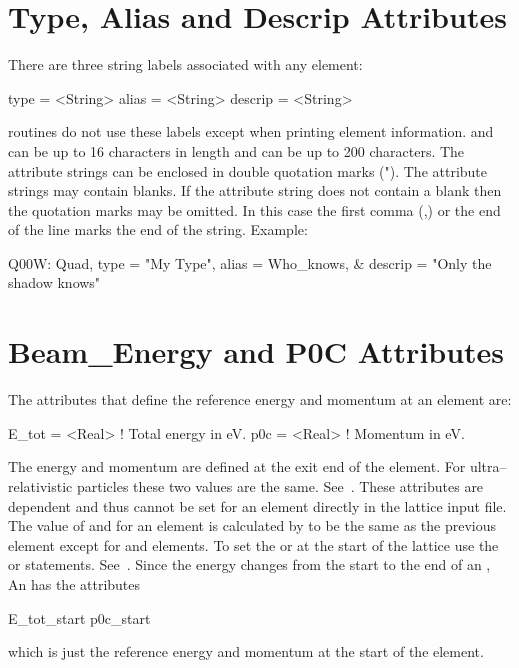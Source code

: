 \section{Type, Alias and Descrip Attributes}
\label{s:string}

There are three string labels associated with any element:
\begin{example}
  type    = <String>
  alias   = <String>
  descrip = <String>
\end{example}
\bmad routines do not use these labels except when printing element
information.  and  can be up to 16 characters in
length and  can be up to 200 characters. The attribute
strings can be enclosed in double quotation marks ("). The attribute
strings may contain blanks. If the attribute string does not contain a
blank then the quotation marks may be omitted. In this case the first
comma (,) or the end of the line marks the end of the string. Example:
\begin{example}
  Q00W: Quad, type = "My Type", alias = Who_knows, &
                                  descrip = "Only the shadow knows"
\end{example}

\section{Beam_Energy and P0C Attributes}
\label{s:energy}
The attributes that define the reference energy and momentum at an element are:
\begin{example}
  E_tot = <Real>  ! Total energy in eV.
  p0c         = <Real>  ! Momentum in eV.
\end{example}
The energy and momentum are defined at the exit end of the element.
For ultra--relativistic particles these two values are the same.
See~. These attributes are dependent and thus
cannot be set for an element directly in the lattice input
file. The value of  and  for an element is calculated by
\bmad to be the same as the previous element except for 
and  elements. To set the  or  at the start of
the lattice use the  or  statements.
See~. Since the energy changes from the start to the end
of an , An  has the attributes
\begin{example}
  E_tot_start
  p0c_start
\end{example}
which is just the reference energy and momentum at the start of the element.


